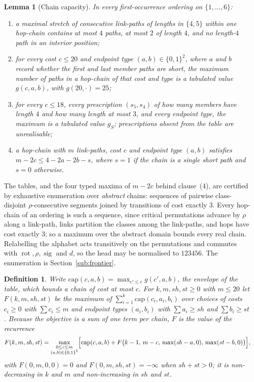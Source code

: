 \documentclass[10pt]{article}
\newtheorem{lemma}[theorem]{Lemma}
\newtheorem{definition}[theorem]{Definition}
\theoremstyle{remark}
\theoremstyle{plain}
\newcommand{\rot}{\operatorname{rot}}
\newcommand{\sig}{\operatorname{sig}}
\begin{document}
\begin{lemma}[Chain capacity]\label{lem:capacity}
In every first-occurrence ordering on $\{1,\dots,6\}$:
\begin{enumerate}
\item a maximal stretch of consecutive link-paths of lengths in
  $\{4,5\}$ within one hop-chain contains at most $4$ paths, at most
  $2$ of length $4$, and no length-$4$ path in an interior position;
\item for every cost $c\le 20$ and endpoint type $(a,b)\in\{0,1\}^2$,
  where $a$ and $b$ record whether the first and last member paths are
  short, the maximum number of paths in a hop-chain of that cost and
  type is a tabulated value $g(c,a,b)$, with $g(20,\cdot)=25$;
\item for every $c\le 18$, every prescription $(s_5,s_4)$ of how many
  members have length $4$ and how many length at most $3$, and every
  endpoint type, the maximum is a tabulated value $g_S$; prescriptions
  absent from the table are unrealisable;
\item a hop-chain with $m$ link-paths, cost $c$ and endpoint type
  $(a,b)$ satisfies $m-2c\le 4-2a-2b-s$, where $s=1$ if the chain is a
  single short path and $s=0$ otherwise.
\end{enumerate}
\end{lemma}

The tables, and the four typed maxima of $m-2c$ behind clause~(4),
are certified by exhaustive enumeration over \emph{abstract} chains:
sequences of pairwise class-disjoint $\rho$-consecutive segments joined
by transitions of cost exactly $3$.  Every hop-chain of an ordering is
such a sequence, since critical permutations advance by $\rho$ along a
link-path, links partition the classes among the link-paths, and hops
have cost exactly $3$; so a maximum over the abstract domain bounds
every real chain.  Relabelling the alphabet acts transitively on the
permutations and commutes with $\rot,\rho,\sig$ and $d$, so the head
may be normalised to $123456$.  The enumeration is
Section~\ref{sub:frontier}.

\begin{definition}\label{def:F}
Write $\mathrm{cap}(c,a,b)=\max_{c'\le c}g(c',a,b)$, the envelope of
the table, which bounds a chain of cost \emph{at most} $c$.  For
$k,m,\mathit{sh},\mathit{st}\ge 0$ with $m\le 20$ let
$F(k,m,\mathit{sh},\mathit{st})$ be the maximum of
$\sum_{i=1}^{k}\mathrm{cap}(c_i,a_i,b_i)$ over choices of costs
$c_i\ge 0$ with $\sum c_i\le m$ and endpoint types $(a_i,b_i)$ with
$\sum a_i\ge \mathit{sh}$ and $\sum b_i\ge \mathit{st}$.  Because the
objective is a sum of one term per chain, $F$ is the value of the
recurrence
\[
F(k,m,\mathit{sh},\mathit{st})=\max_{\substack{0\le c\le m\\(a,b)\in\{0,1\}^2}}
\Bigl[\mathrm{cap}(c,a,b)+F\bigl(k-1,\,m-c,\,\max(\mathit{sh}-a,0),\,
\max(\mathit{st}-b,0)\bigr)\Bigr],
\]
with $F(0,m,0,0)=0$ and $F(0,m,\mathit{sh},\mathit{st})=-\infty$ when
$\mathit{sh}+\mathit{st}>0$; it is non-decreasing in $k$ and $m$ and
non-increasing in $\mathit{sh}$ and $\mathit{st}$.
\end{definition}
\end{document}
